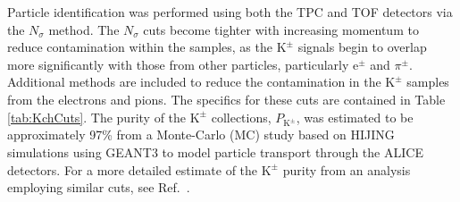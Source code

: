 \documentclass[ALICE,manyauthors]{cernphprep}
\newcommand{\Kpm}{$\mathrm{K^{\pm}}$\xspace}
\begin{document}
Particle identification was performed using both the TPC and TOF detectors via the $N_{\sigma}$ method. 
The $N_{\sigma}$ cuts become tighter with increasing momentum to reduce contamination within the samples, as the \Kpm signals begin to overlap more significantly with those from other particles, particularly e$^{\pm}$ and $\pi^{\pm}$.
Additional methods are included to reduce the contamination in the \Kpm samples from the electrons and pions.  
The specifics for these cuts are contained in Table \ref{tab:KchCuts}.
The purity of the \Kpm collections, $P_{\mathrm{K}^{\pm}}$, was estimated to be approximately 97\% from a Monte-Carlo (MC) study based on HIJING \cite{PhysRevD.44.3501} simulations using GEANT3 \cite{Brun:1994aa} to model particle transport through the ALICE detectors. 
For a more detailed estimate of the \Kpm purity from an analysis employing similar cuts, see Ref.\ \cite{Acharya:2017qtq}.
\end{document}
